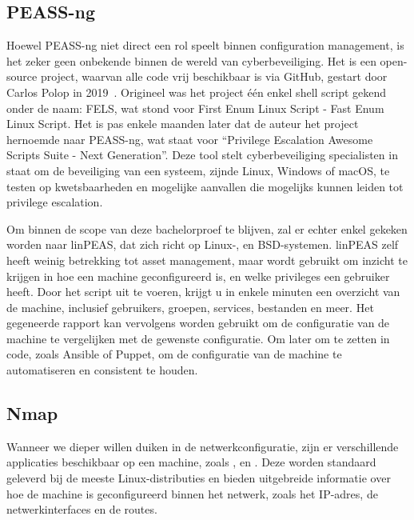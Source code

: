 \subsection{PEASS-ng}
\label{sub:peass-ng}

Hoewel PEASS-ng niet direct een rol speelt binnen configuration management, is het zeker geen onbekende binnen de wereld van cyberbeveiliging.
Het is een open-source project, waarvan alle code vrij beschikbaar is via GitHub, gestart door Carlos Polop in 2019~\autocite{peass-ng-github}.
Origineel was het project \'e\'en enkel shell script gekend onder de naam: FELS, wat stond voor First Enum Linux Script - Fast Enum Linux Script.
Het is pas enkele maanden later dat de auteur het project hernoemde naar PEASS-ng, wat staat voor ``Privilege Escalation Awesome Scripts Suite - Next Generation''.
Deze tool stelt cyberbeveiliging specialisten in staat om de beveiliging van een systeem, zijnde Linux, Windows of macOS, te testen op kwetsbaarheden en mogelijke aanvallen die mogelijks kunnen leiden tot privilege escalation.

Om binnen de scope van deze bachelorproef te blijven, zal er echter enkel gekeken worden naar linPEAS, dat zich richt op Linux-, en BSD-systemen.
linPEAS zelf heeft weinig betrekking tot asset management, maar wordt gebruikt om inzicht te krijgen in hoe een machine geconfigureerd is, en welke privileges een gebruiker heeft.
Door het script uit te voeren, krijgt u in enkele minuten een overzicht van de machine, inclusief gebruikers, groepen, services, bestanden en meer.
Het gegeneerde rapport kan vervolgens worden gebruikt om de configuratie van de machine te vergelijken met de gewenste configuratie.
Om later om te zetten in code, zoals Ansible of Puppet, om de configuratie van de machine te automatiseren en consistent te houden.

\subsection{Nmap}
\label{sub:nmap}

Wanneer we dieper willen duiken in de netwerkconfiguratie, zijn er verschillende applicaties beschikbaar op een machine, zoals ,  en .
Deze worden standaard geleverd bij de meeste Linux-distributies en bieden uitgebreide informatie over hoe de machine is geconfigureerd binnen het netwerk, zoals het IP-adres, de netwerkinterfaces en de routes.

